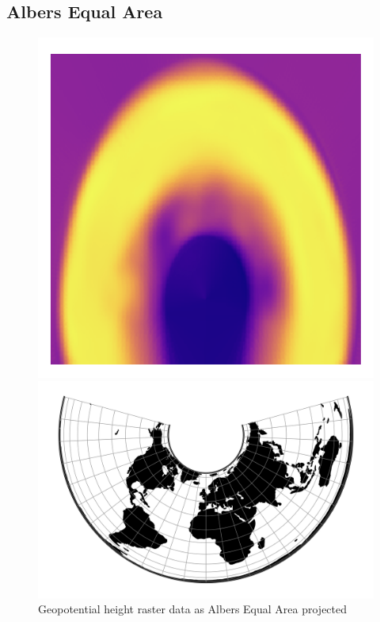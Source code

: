 \subsection{Albers Equal Area}
\begin{figure}[h]
    \centering
    \begin{minipage}{0.30\textwidth}
        \centering
        \includegraphics[width=0.9\linewidth]{figures/chapter-8/geopoth_aea.png}
        \caption{ Geopotential height raster data as Albers Equal Area projected}
        \label{fig:aea_geopoth_raster}
    \end{minipage}\hfill
    \begin{minipage}{0.30\textwidth}
        \centering
        \includegraphics[width=0.9\linewidth]{figures/chapter-8/aea.png}

\end{minipage}
\end{figure}
